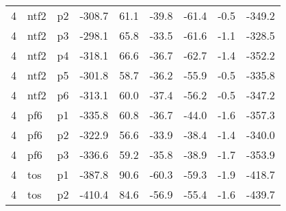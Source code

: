 \documentclass[a4paper]{article}
\begin{document}
\begin{table}[ht]
\begin{tabular}{rllrrrrrr}
   4 & ntf2 & p2 & -308.7 & 61.1 & -39.8 & -61.4 & -0.5 & -349.2 \\ 
   4 & ntf2 & p3 & -298.1 & 65.8 & -33.5 & -61.6 & -1.1 & -328.5 \\ 
   4 & ntf2 & p4 & -318.1 & 66.6 & -36.7 & -62.7 & -1.4 & -352.2 \\ 
   4 & ntf2 & p5 & -301.8 & 58.7 & -36.2 & -55.9 & -0.5 & -335.8 \\ 
   4 & ntf2 & p6 & -313.1 & 60.0 & -37.4 & -56.2 & -0.5 & -347.2 \\ 
   4 & pf6 & p1 & -335.8 & 60.8 & -36.7 & -44.0 & -1.6 & -357.3 \\ 
   4 & pf6 & p2 & -322.9 & 56.6 & -33.9 & -38.4 & -1.4 & -340.0 \\ 
   4 & pf6 & p3 & -336.6 & 59.2 & -35.8 & -38.9 & -1.7 & -353.9 \\ 
   4 & tos & p1 & -387.8 & 90.6 & -60.3 & -59.3 & -1.9 & -418.7 \\ 
   4 & tos & p2 & -410.4 & 84.6 & -56.9 & -55.4 & -1.6 & -439.7 \\ 
   \hline
\end{tabular}
\end{table}
\end{document}
